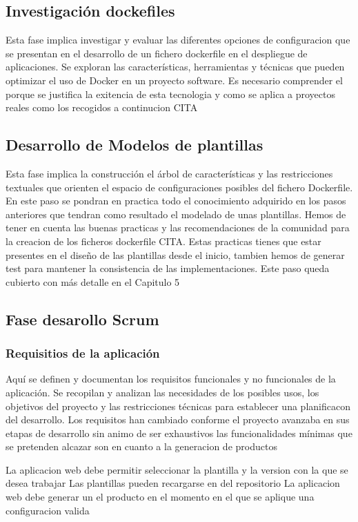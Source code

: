 \documentclass[12pt, a4paper, twoside]{article}
\begin{document}
\subsection{Investigación dockefiles}
Esta fase implica investigar y evaluar las diferentes opciones de configuracion que se presentan en el desarrollo de un fichero dockerfile en el 
despliegue de aplicaciones. Se exploran las características, herramientas y técnicas que pueden optimizar el uso de 
Docker en un proyecto software. Es necesario comprender el porque se justifica la exitencia de esta tecnologia y como se aplica a 
proyectos reales como los recogidos a continucion CITA

\subsection{Desarrollo de Modelos de plantillas}
Esta fase implica la construcción el árbol de características y las restricciones textuales que orienten el espacio de 
configuraciones posibles del fichero Dockerfile. En este paso se pondran en practica todo el conocimiento adquirido en los pasos anteriores que 
tendran como resultado el modelado de unas plantillas. Hemos de tener en cuenta las buenas practicas y las recomendaciones de la comunidad para la creacion de los ficheros dockerfile CITA. 
Estas practicas tienes que estar presentes en el diseño de las plantillas desde el inicio, tambien hemos de generar test para mantener la consistencia de las implementaciones. 
Este paso queda cubierto con más detalle en el Capitulo 5


\subsection{Fase desarollo Scrum}
\subsubsection{Requisitios de la aplicación }
Aquí se definen y documentan los requisitos funcionales y no funcionales de la aplicación. Se recopilan y analizan las 
necesidades de los posibles usos, los objetivos del proyecto y las restricciones técnicas para establecer una planificacon del desarrollo. 
Los requisitos han cambiado conforme el proyecto avanzaba en sus etapas de desarrollo
sin animo de ser exhaustivos las funcionalidades mínimas que se pretenden alcazar son en cuanto a la generacion de productos

La aplicacion web debe permitir seleccionar la plantilla y la version con la que se desea trabajar 
Las plantillas pueden recargarse en del repositorio 
La aplicacion web debe generar un el producto en el momento en el que se aplique una configuracion valida 
\end{document}
